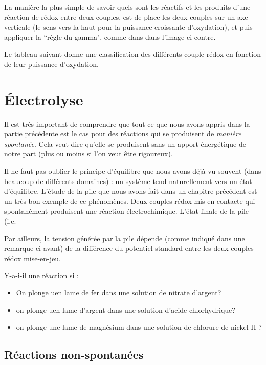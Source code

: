 \documentclass[11pt,a4paper]{article}
\begin{document}
La manière la plus simple de savoir quels sont les réactifs et les produits d'une réaction de rédox entre deux couples, est de place les deux couples sur un axe verticale (le sens vers la haut pour la puissance croissante d'oxydation), et puis appliquer la ``règle du gamma", comme dans dans l'image ci-contre. 

Le tableau suivant donne une classification des différents couple rédox en fonction de leur puissance d'oxydation. 

\section{Électrolyse}
Il est très important de comprendre que tout ce que nous avons appris dans la partie précédente est le cas pour des réactions qui se produisent de \textit{manière spontanée}. Cela veut dire qu'elle se produisent sans un apport énergétique de notre part (plus ou moins si l'on veut être rigoureux). 

Il ne faut pas oublier le principe d'équilibre que nous avons déjà vu souvent (dans beaucoup de différents domaines) : un système tend naturellement vers un état d'équilibre. L'étude de la pile que nous avons fait dans un chapitre précédent est un très bon exemple de ce phénomènes. Deux couples rédox mis-en-contacte qui spontanément produisent une réaction électrochimique. L'état finale de la pile (i.e. 

Par ailleurs, la tension générée par la pile dépende (comme indiqué dans une remarque ci-avant) de la différence du potentiel standard entre les deux couples rédox mise-en-jeu. 



\begin{exo}
Y-a-i-il une réaction si : 
\begin{itemize}
    \item On plonge uen lame de fer dans une solution de nitrate d'argent? 
    \vspace{1cm}
    \item on plonge uen lame d'argent dans une solution d'acide chlorhydrique? 
    \vspace{1cm}
    \item on plonge une lame de magnésium dans une solution de chlorure de nickel II ? 
    \vspace{1cm}
\end{itemize}
\end{exo}


\subsection{Réactions non-spontanées}
\end{document}
